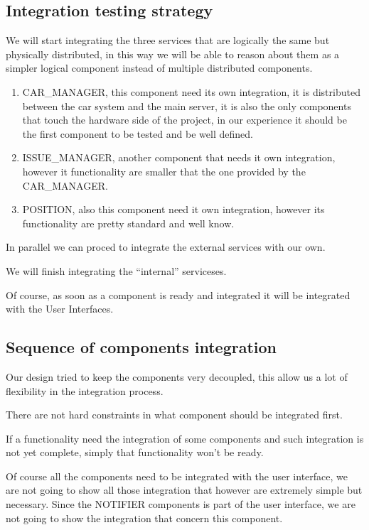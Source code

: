\documentclass[11pt]{article} %
\begin{document}
\subsection{Integration testing strategy}

We will start integrating the three services that are logically the same but physically distributed, in this way we will be able to reason about them as a simpler logical component instead of multiple distributed components.

\begin{enumerate}
	\item CAR\_MANAGER, this component need its own integration, it is distributed between the car system and the main server, it is also the only components that touch the hardware side of the project, in our experience it should be the first component to be tested and be well defined.
	\item ISSUE\_MANAGER, another component that needs it own integration, however it functionality are smaller that the one provided by the CAR\_MANAGER.
	\item POSITION, also this component need it own integration, however its functionality are pretty standard and well know.
\end{enumerate}

In parallel we can proced to integrate the external services with our own.

We will finish integrating the ``internal'' serviceses.

Of course, as soon as a component is ready and integrated it will be integrated with the User Interfaces.

\subsection{Sequence of components integration}

Our design tried to keep the components very decoupled, this allow us a lot of flexibility in the integration process.

There are not hard constraints in what component should be integrated first.

If a functionality need the integration of some components and such integration is not yet complete, simply that functionality won't be ready.

Of course all the components need to be integrated with the user interface, we are not going to show all those integration that however are extremely simple but necessary. Since the NOTIFIER components is part of the user interface, we are not going to show the integration that concern this component.
\end{document}
